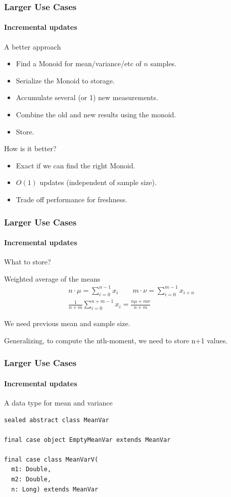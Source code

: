 \documentclass{beamer}
\begin{document}
\begin{frame}
  \frametitle{Larger Use Cases}
  \framesubtitle{Incremental updates}
  \begin{block}{A better approach}
  \begin{itemize}
    \item Find a \alert{Monoid for mean/variance/etc} of \(n\) samples.
    \item Serialize the Monoid to storage.
    \item Accumulate several (or 1) new measurements.
    \item \alert{Combine} the old and new results using the monoid.
    \item Store.
  \end{itemize}
  \end{block}

  \pause

  \begin{block}{How is it better?}
  \begin{itemize}
    \item \alert{Exact} if we can find the right Monoid.
    \item \alert{\(O(1)\) updates} (independent of sample size).
    \item Trade off performance for freshness.
  \end{itemize}
  \end{block}

\end{frame}

\begin{frame}
  \frametitle{Larger Use Cases}
  \framesubtitle{Incremental updates}
  What to store?
  \begin{block}{Weighted average of the means}
    \[
    \begin{split}
      n\cdot \mu = \sum_{i=0}^{n-1} x_i \qquad  m\cdot \nu = \sum_{i=0}^{m-1} x_{i+n} \\
      \frac{1}{n+m} \sum_{i=0}^{n+m-1} x_i = \frac{n\mu + m\nu} {n+m}
    \end{split}
    \]
  \end{block}

  We need previous \alert{mean} and \alert{sample size.}

  Generalizing, to compute the nth-moment, we need to store n+1 values.
\end{frame}

\begin{frame}[fragile]
  \frametitle{Larger Use Cases}
  \framesubtitle{Incremental updates}
  \begin{block}{A data type for mean and variance}
  \begin{lstlisting}
sealed abstract class MeanVar

final case object EmptyMeanVar extends MeanVar

final case class MeanVarV(
  m1: Double,
  m2: Double,
  n: Long) extends MeanVar
  \end{lstlisting}
  \end{block}
\end{frame}
\end{document}
